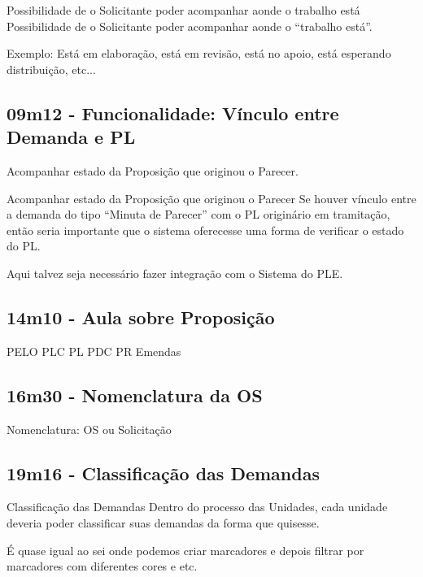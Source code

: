 \begin{funcionalidade}[1]{Possibilidade de o Solicitante poder acompanhar aonde o trabalho está}
	Possibilidade de o Solicitante poder acompanhar aonde o ``trabalho está''.
\end{funcionalidade}

Exemplo: Está em elaboração, está em revisão, está no apoio, está esperando distribuição, etc...

\subsection{09m12 - Funcionalidade: Vínculo entre Demanda e PL}

Acompanhar estado da Proposição que originou o Parecer.

\begin{funcionalidade}{Acompanhar estado da Proposição que originou o Parecer}
	Se houver vínculo entre a demanda do tipo ``Minuta de Parecer'' com o PL originário em tramitação, então seria importante que o sistema oferecesse uma forma de verificar o estado do PL.
	
	Aqui talvez seja necessário fazer integração com o Sistema do PLE.
\end{funcionalidade}

\subsection{14m10 - Aula sobre Proposição}

PELO
PLC
PL
PDC
PR
Emendas

\subsection{16m30 - Nomenclatura da OS}

Nomenclatura: OS ou Solicitação

\subsection{19m16 - Classificação das Demandas}

\begin{funcionalidade}{Classificação das Demandas}
	Dentro do processo das Unidades, cada unidade deveria poder classificar suas demandas da forma que quisesse.
	
	É quase igual ao sei onde podemos criar marcadores e depois filtrar por marcadores com diferentes cores e etc.		
\end{funcionalidade}	

